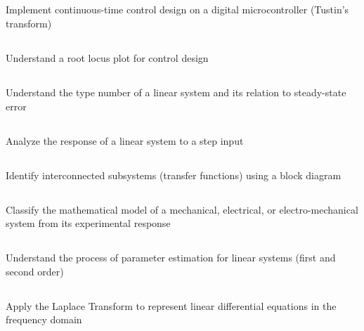 \documentclass[11pt,courier]{navymemo}
\begin{document}
\subsection{} Implement continuous-time control design on a digital microcontroller (Tustin’s transform)
\subsection{} Understand a root locus plot for control design 
\subsection{} Understand the type number of a linear system and its relation to steady-state error
\subsection{} Analyze the response of a linear system to a step input
\subsection{} Identify interconnected subsystems (transfer functions) using a block diagram
\subsection{} Classify the mathematical model of a mechanical, electrical, or electro-mechanical system from its experimental response
\subsection{} Understand the process of parameter estimation for linear systems (first and second order)
\subsection{} Apply the Laplace Transform to represent linear differential equations in the frequency domain
\end{document}
